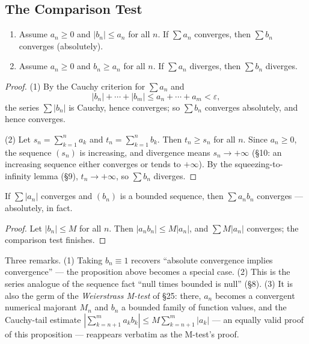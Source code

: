 \documentclass[11pt]{report}
\begin{document}
\subsection{The Comparison Test}

\begin{thmbox}
\begin{enumerate}[label=(\arabic*)]
    \item Assume $a_n \geq 0$ and $|b_n| \leq a_n$ for all $n$. If $\sum a_n$ converges, then $\sum b_n$ converges (absolutely).
    \item Assume $a_n \geq 0$ and $b_n \geq a_n$ for all $n$. If $\sum a_n$ diverges, then $\sum b_n$ diverges.
\end{enumerate}
\end{thmbox}

\begin{proof}
(1) By the Cauchy criterion for $\sum a_n$ and
\[
|b_n| + \cdots + |b_m| \leq a_n + \cdots + a_m < \varepsilon,
\]
the series $\sum |b_n|$ is Cauchy, hence converges; so $\sum b_n$ converges absolutely, and hence converges.

(2) Let $s_n = \sum_{k=1}^n a_k$ and $t_n = \sum_{k=1}^n b_k$. Then $t_n \geq s_n$ for all $n$. Since $a_n \geq 0$, the sequence $(s_n)$ is increasing, and divergence means $s_n \to +\infty$ (\S 10: an increasing sequence either converges or tends to $+\infty$). By the squeezing-to-infinity lemma (\S 9), $t_n \to +\infty$, so $\sum b_n$ diverges.
\end{proof}

\begin{propbox}
If $\sum |a_n|$ converges and $(b_n)$ is a bounded sequence, then $\sum a_n b_n$ converges --- absolutely, in fact.
\end{propbox}

\begin{proof}
Let $|b_n| \leq M$ for all $n$. Then $|a_n b_n| \leq M |a_n|$, and $\sum M|a_n|$ converges; the comparison test finishes.
\end{proof}

\begin{rembox}
Three remarks. (1) Taking $b_n \equiv 1$ recovers ``absolute convergence implies convergence'' --- the proposition above becomes a special case. (2) This is the series analogue of the sequence fact ``null times bounded is null'' (\S 8). (3) It is also the germ of the \emph{Weierstrass M-test} of \S 25: there, $a_n$ becomes a convergent numerical majorant $M_n$ and $b_n$ a bounded family of function values, and the Cauchy-tail estimate $\left|\sum_{k=n+1}^m a_k b_k\right| \leq M \sum_{k=n+1}^m |a_k|$ --- an equally valid proof of this proposition --- reappears verbatim as the M-test's proof.
\end{rembox}
\end{document}

